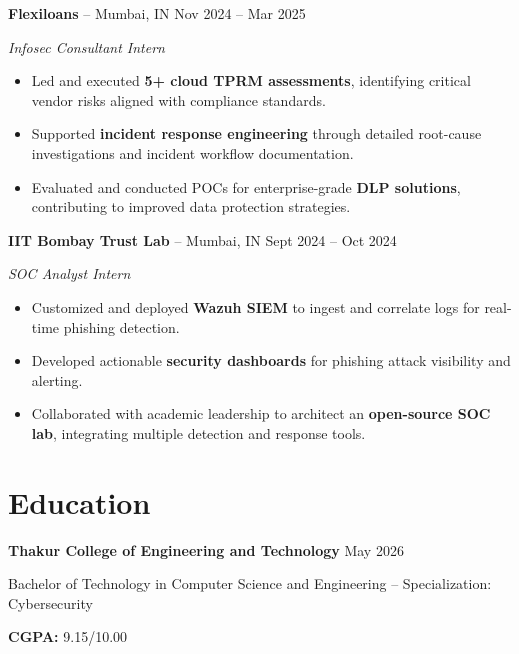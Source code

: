 \documentclass[11pt, a4paper]{article}
\begin{document}
\textbf{Flexiloans} -- Mumbai, IN \hfill Nov 2024 -- Mar 2025

\textit{Infosec Consultant Intern}

\begin{itemize}[label=-]
    \item Led and executed \textbf{5+ cloud TPRM assessments}, identifying critical vendor risks aligned with compliance standards.

    \item Supported \textbf{incident response engineering} through detailed root-cause investigations and incident workflow documentation.

    \item Evaluated and conducted POCs for enterprise-grade \textbf{DLP solutions}, contributing to improved data protection strategies.
\end{itemize}

\textbf{IIT Bombay Trust Lab} -- Mumbai, IN \hfill Sept 2024 -- Oct 2024

\textit{SOC Analyst Intern}

\begin{itemize}[label=-]
    \item Customized and deployed \textbf{Wazuh SIEM} to ingest and correlate logs for real-time phishing detection.

    \item Developed actionable \textbf{security dashboards} for phishing attack visibility and alerting.

    \item Collaborated with academic leadership to architect an \textbf{open-source SOC lab}, integrating multiple detection and response tools.
\end{itemize}


\section*{Education}

\textbf{Thakur College of Engineering and Technology}
\hfill May 2026

Bachelor of Technology in Computer Science and Engineering -- Specialization: Cybersecurity

\textbf{CGPA:} 9.15/10.00

\end{document}

